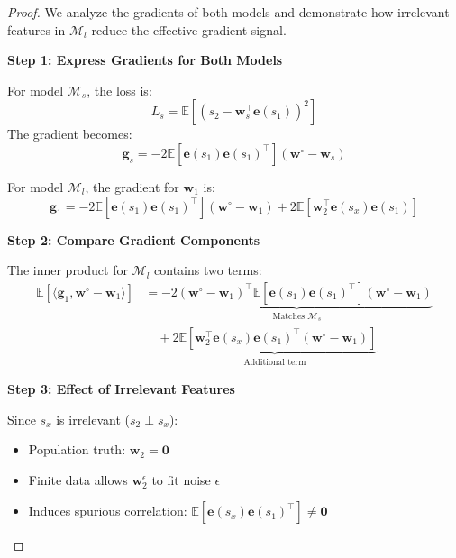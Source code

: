 \begin{proof}
We analyze the gradients of both models and demonstrate how irrelevant features in \( \mathcal{M}_l \) reduce the effective gradient signal.

\noindent \textbf{Step 1: Express Gradients for Both Models}

For model \( \mathcal{M}_s \), the loss is:
\[
L_s = \mathbb{E}\left[(s_2 - \mathbf{w}_s^\top \mathbf{e}(s_1))^2\right]
\]
The gradient becomes:
\begin{equation}
\mathbf{g}_s = -2 \mathbb{E}\left[\mathbf{e}(s_1)\mathbf{e}(s_1)^\top\right](\mathbf{w}^\circ - \mathbf{w}_s)
\label{eq:grad_s}
\end{equation}

For model \( \mathcal{M}_l \), the gradient for \( \mathbf{w}_1 \) is:
\begin{equation}
\mathbf{g}_1 = -2 \mathbb{E}\left[\mathbf{e}(s_1)\mathbf{e}(s_1)^\top\right](\mathbf{w}^\circ - \mathbf{w}_1) + 2 \mathbb{E}\left[\mathbf{w}_2^\top \mathbf{e}(s_x)\mathbf{e}(s_1)\right]
\label{eq:grad_l}
\end{equation}

\noindent \textbf{Step 2: Compare Gradient Components}

The inner product for \( \mathcal{M}_l \) contains two terms:
\begin{equation}
\begin{aligned}
    \mathbb{E}\left[\langle \mathbf{g}_1, \mathbf{w}^\circ - \mathbf{w}_1 \rangle \right] 
    &= \underbrace{-2 (\mathbf{w}^\circ - \mathbf{w}_1)^\top \mathbb{E}\left[\mathbf{e}(s_1)\mathbf{e}(s_1)^\top\right] (\mathbf{w}^\circ - \mathbf{w}_1)}_{\text{Matches } \mathcal{M}_s} \\
    &\quad + \underbrace{2 \mathbb{E}\left[\mathbf{w}_2^\top \mathbf{e}(s_x)\mathbf{e}(s_1)^\top (\mathbf{w}^\circ - \mathbf{w}_1)\right]}_{\text{Additional term}}
\end{aligned}
\end{equation}


\noindent \textbf{Step 3: Effect of Irrelevant Features}

Since \( s_x \) is irrelevant (\( s_2 \perp s_x \)):
\begin{itemize}
\item Population truth: \( \mathbf{w}_2 = \mathbf{0} \)
\item Finite data allows \( \mathbf{w}_2^\epsilon \) to fit noise \( \epsilon \)
\item Induces spurious correlation: \( \mathbb{E}\left[\mathbf{e}(s_x)\mathbf{e}(s_1)^\top\right] \neq \mathbf{0} \)
\end{itemize}


\end{proof}
